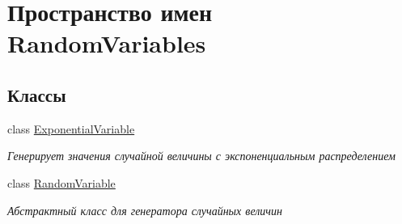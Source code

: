 \hypertarget{namespace_random_variables}{}\section{Пространство имен Random\+Variables}
\label{namespace_random_variables}
\subsection*{Классы}
\begin{DoxyCompactItemize}
\item 
class \hyperlink{class_random_variables_1_1_exponential_variable}{Exponential\+Variable}
\begin{DoxyCompactList}\small\item\em Генерирует значения случайной величины с экспоненциальным распределением \end{DoxyCompactList}\item 
class \hyperlink{class_random_variables_1_1_random_variable}{Random\+Variable}
\begin{DoxyCompactList}\small\item\em Абстрактный класс для генератора случайных величин \end{DoxyCompactList}\end{DoxyCompactItemize}
